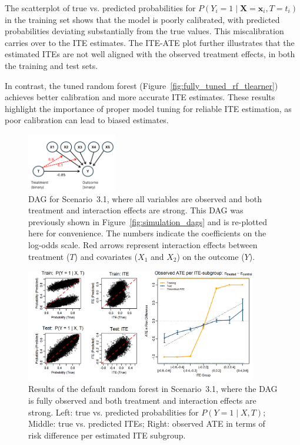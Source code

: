 The scatterplot of true vs. predicted probabilities for $P(Y_i = 1 \mid \mathbf{X} = \mathbf{x}_i, T = t_i)$ in the training set shows that the model is poorly calibrated, with predicted probabilities deviating substantially from the true values. This miscalibration carries over to the ITE estimates. The ITE-ATE plot further illustrates that the estimated ITEs are not well aligned with the observed treatment effects, in both the training and test sets.

In contrast, the tuned random forest (Figure~\ref{fig:fully_tuned_rf_tlearner}) achieves better calibration and more accurate ITE estimates. These results highlight the importance of proper model tuning for reliable ITE estimation, as poor calibration can lead to biased estimates.



\begin{figure}[htbp]
\centering
\includegraphics[width=0.35\textwidth]{img/results_ITE_simulation/simulation_observed.png}
\caption{DAG for Scenario~3.1, where all variables are observed and both treatment and interaction effects are strong. This DAG was previously shown in Figure~\ref{fig:simulation_dags} and is re-plotted here for convenience. The numbers indicate the coefficients on the log-odds scale. Red arrows represent interaction effects between treatment ($T$) and covariates ($X_1$ and $X_2$) on the outcome ($Y$).}
\label{fig:fully_observed_dag_rf_appendix}
\end{figure}


\begin{figure}[htbp]
\centering
\includegraphics[width=0.9\textwidth]{img/results_ITE_simulation/fully_observed_rf_tlearner.png}
\caption{Results of the default random forest in Scenario~3.1, where the DAG is fully observed and both treatment and interaction effects are strong. Left: true vs. predicted probabilities for $P(Y = 1 \mid X, T)$; Middle: true vs. predicted ITEs; Right: observed ATE in terms of risk difference per estimated ITE subgroup.}
\label{fig:fully_observed_rf}
\end{figure}




